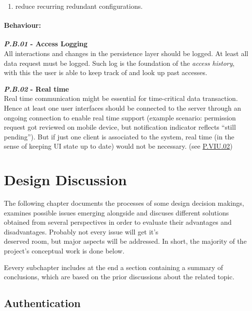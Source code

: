 \documentclass[12pt,english,a4paper,titlepage,cleardoublepage=empty,dottedtoc]{report}
\providecommand{\tightlist}{%
  \setlength{\itemsep}{0pt}\setlength{\parskip}{0pt}}
\begin{document}
\begin{enumerate}
\def\labelenumi{(\Alph{enumi})}
\setcounter{enumi}{1}
\tightlist
\item
  reduce recurring redundant configurations.
\end{enumerate}

\subsubsection{Behaviour:}\label{behaviour}

\textbf{\emph{\protect\hypertarget{pb01}{}{P.B.01}} - Access Logging}\\
All interactions and changes in the persistence layer should be logged.
At least all data request must be logged. Such log is the foundation of
the \emph{access history}, with this the user is able to keep track of
and look up past accesses.

\textbf{\emph{\protect\hypertarget{pb02}{}{P.B.02}} - Real time}\\
Real time communication might be essential for time-critical data
transaction. Hence at least one user interfaces should be connected to
the server through an ongoing connection to enable real time support
(example scenario: permission request got reviewed on mobile device, but
notification indicator reflects ``still pending''). But if just one
client is associated to the system, real time (in the sense of keeping
UI state up to date) would not be necessary. (see
\protect\hyperlink{pviu02ux5cux257D}{P.VIU.02})

\chapter{Design Discussion}\label{design-discussion}

The following chapter documents the processes of some design decision
makings, examines possible issues emerging alongside and discuses
different solutions obtained from several perspectives in order to
evaluate their advantages and disadvantages. Probably not every issue
will get it's\\
deserved room, but major aspects will be addressed. In short, the
majority of the project's conceptual work is done below.

Eevery subchapter includes at the end a section containing a summary of
conclusions, which are based on the prior discussions about the related
topic.

\hypertarget{authentication}{\section{Authentication}\label{authentication}}
\end{document}
